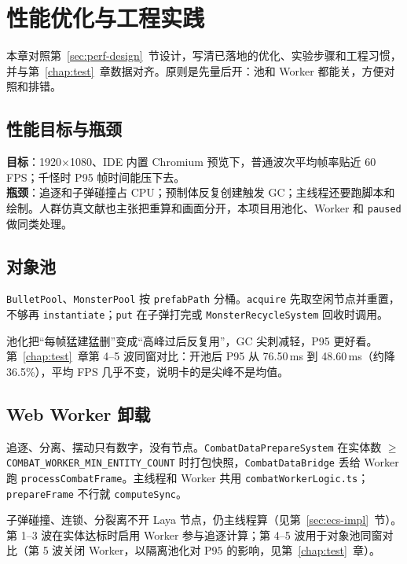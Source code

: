 \chapter{性能优化与工程实践}
\label{chap:performance}

本章对照第~\ref{sec:perf-design}~节设计，写清已落地的优化、实验步骤和工程习惯，并与第~\ref{chap:test}~章数据对齐。原则是先量后开：池和 Worker 都能关，方便对照和排错。

\section{性能目标与瓶颈}

\textbf{目标}：1920$\times$1080、IDE 内置 Chromium 预览下，普通波次平均帧率贴近 60 FPS；千怪时 P95 帧时间能压下去。\\
\textbf{瓶颈}：追逐和子弹碰撞占 CPU；预制体反复创建触发 GC；主线程还要跑脚本和绘制\cite{gregory2018game,cantrell2018unity}。人群仿真文献也主张把重算和画面分开\cite{cantrell2018unity,bott2014unreal}，本项目用池化、Worker 和 \texttt{paused} 做同类处理。

\section{对象池}

\texttt{BulletPool}、\texttt{MonsterPool} 按 \texttt{prefabPath} 分桶。\texttt{acquire} 先取空闲节点并重置，不够再 \texttt{instantiate}；\texttt{put} 在子弹打完或 \texttt{MonsterRecycleSystem} 回收时调用。

池化把“每帧猛建猛删”变成“高峰过后反复用”，GC 尖刺减轻，P95 更好看。第~\ref{chap:test}~章第 4--5 波同窗对比：开池后 P95 从 76.50\,ms 到 48.60\,ms（约降 36.5\%），平均 FPS 几乎不变，说明卡的是尖峰不是均值。

\section{Web Worker 卸载}

追逐、分离、摆动只有数字，没有节点。\texttt{CombatDataPrepareSystem} 在实体数 $\geq$ \texttt{COMBAT\_WORKER\_MIN\_ENTITY\_COUNT} 时打包快照，\texttt{CombatDataBridge} 丢给 Worker 跑 \texttt{processCombatFrame}。主线程和 Worker 共用 \texttt{combatWorkerLogic.ts}；\texttt{prepareFrame} 不行就 \texttt{computeSync}。

子弹碰撞、连锁、分裂离不开 Laya 节点，仍主线程算（见第~\ref{sec:ecs-impl}~节）。第 1--3 波在实体达标时启用 Worker 参与追逐计算；第 4--5 波用于对象池同窗对比（第 5 波关闭 Worker，以隔离池化对 P95 的影响，见第~\ref{chap:test}~章）。

